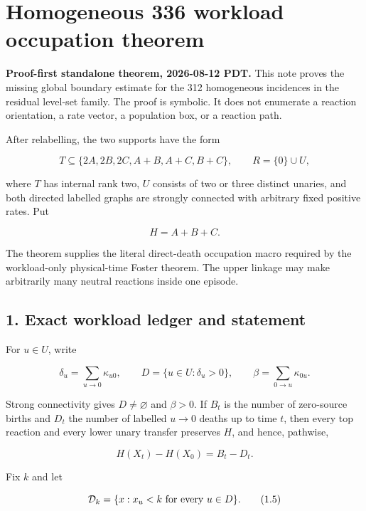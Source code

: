 \section{Homogeneous 336 workload occupation
theorem}

\textbf{Proof-first standalone theorem, 2026-08-12 PDT.} This note
proves the missing global boundary estimate for the 312 homogeneous
incidences in the residual level-set family. The proof is symbolic. It
does not enumerate a reaction orientation, a rate vector, a population
box, or a reaction path.

After relabelling, the two supports have the form

\[
 T\subseteq\{2A,2B,2C,A+B,A+C,B+C\},\qquad
 R=\{0\}\cup U,                                      \tag{1.1}
\]

where \(T\) has internal rank two, \(U\) consists of two or three
distinct unaries, and both directed labelled graphs are strongly
connected with arbitrary fixed positive rates. Put

\[
                         H=A+B+C.                    \tag{1.2}
\]

The theorem supplies the literal direct-death occupation macro required
by the workload-only physical-time Foster theorem. The upper linkage may
make arbitrarily many neutral reactions inside one episode.

\subsection{1. Exact workload ledger and
statement}

For \(u\in U\), write

\[
 \delta_u=\sum_{u\to0}\kappa_{u0},\qquad
 D=\{u\in U:\delta_u>0\},\qquad
 \beta=\sum_{0\to u}\kappa_{0u}.                    \tag{1.3}
\]

Strong connectivity gives \(D\ne\varnothing\) and \(\beta>0\). If
\(B_t\) is the number of zero-source births and \(D_t\) the number of
labelled \(u\to0\) deaths up to time \(t\), then every top reaction and
every lower unary transfer preserves \(H\), and hence, pathwise,

\[
                  H(X_t)-H(X_0)=B_t-D_t.             \tag{1.4}
\]

Fix \(k\) and let

\[
 {\cal D}_k=\{x:x_u<k\text{ for every }u\in D\}.     \tag{1.5}
\]


